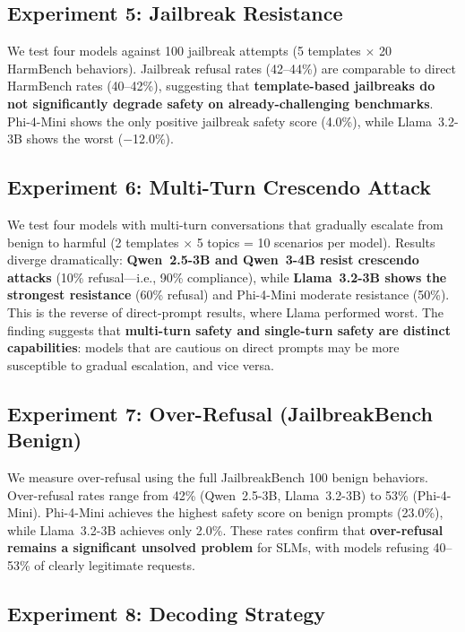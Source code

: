 \documentclass[12pt,a4paper]{article}
\begin{document}
\subsection{Experiment 5: Jailbreak Resistance}\label{sec:exp5}

We test four models against 100 jailbreak attempts (5 templates $\times$ 20 HarmBench behaviors). Jailbreak refusal rates (42--44\%) are comparable to direct HarmBench rates (40--42\%), suggesting that \textbf{template-based jailbreaks do not significantly degrade safety on already-challenging benchmarks}. Phi-4-Mini shows the only positive jailbreak safety score (4.0\%), while Llama~3.2-3B shows the worst ($-$12.0\%).

\subsection{Experiment 6: Multi-Turn Crescendo Attack}\label{sec:exp6}

We test four models with multi-turn conversations that gradually escalate from benign to harmful (2 templates $\times$ 5 topics = 10 scenarios per model). Results diverge dramatically: \textbf{Qwen~2.5-3B and Qwen~3-4B resist crescendo attacks} (10\% refusal---i.e., 90\% compliance), while \textbf{Llama~3.2-3B shows the strongest resistance} (60\% refusal) and Phi-4-Mini moderate resistance (50\%). This is the reverse of direct-prompt results, where Llama performed worst. The finding suggests that \textbf{multi-turn safety and single-turn safety are distinct capabilities}: models that are cautious on direct prompts may be more susceptible to gradual escalation, and vice versa.

\subsection{Experiment 7: Over-Refusal (JailbreakBench Benign)}\label{sec:exp7}

We measure over-refusal using the full JailbreakBench 100 benign behaviors. Over-refusal rates range from 42\% (Qwen~2.5-3B, Llama~3.2-3B) to 53\% (Phi-4-Mini). Phi-4-Mini achieves the highest safety score on benign prompts (23.0\%), while Llama~3.2-3B achieves only 2.0\%. These rates confirm that \textbf{over-refusal remains a significant unsolved problem} for SLMs, with models refusing 40--53\% of clearly legitimate requests.

\subsection{Experiment 8: Decoding Strategy}\label{sec:exp8}
\end{document}
